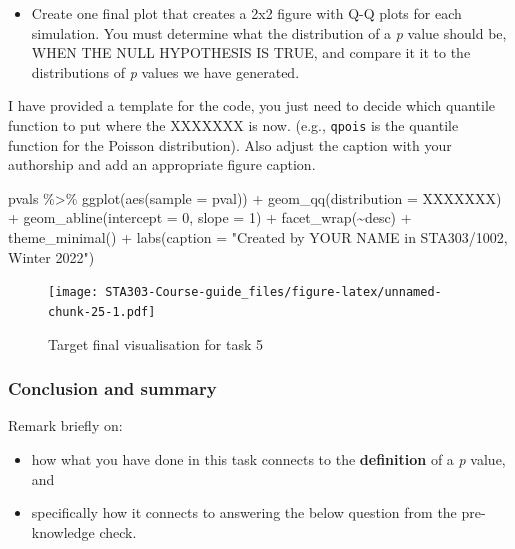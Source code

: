 \documentclass[
  openany]{book}
\newenvironment{Shaded}{\begin{snugshade}}{\end{snugshade}}
\newcommand{\AttributeTok}[1]{\textcolor[rgb]{0.77,0.63,0.00}{#1}}
\newcommand{\DecValTok}[1]{\textcolor[rgb]{0.00,0.00,0.81}{#1}}
\newcommand{\FunctionTok}[1]{\textcolor[rgb]{0.00,0.00,0.00}{#1}}
\newcommand{\NormalTok}[1]{#1}
\newcommand{\SpecialCharTok}[1]{\textcolor[rgb]{0.00,0.00,0.00}{#1}}
\newcommand{\StringTok}[1]{\textcolor[rgb]{0.31,0.60,0.02}{#1}}
\providecommand{\tightlist}{%
  \setlength{\itemsep}{0pt}\setlength{\parskip}{0pt}}
\begin{document}
\begin{itemize}
\tightlist
\item
  Create one final plot that creates a 2x2 figure with Q-Q plots for each simulation. You must determine what the distribution of a \emph{p} value should be, WHEN THE NULL HYPOTHESIS IS TRUE, and compare it it to the distributions of \emph{p} values we have generated.
\end{itemize}

I have provided a template for the code, you just need to decide which quantile function to put where the XXXXXXX is now. (e.g., \texttt{qpois} is the quantile function for the Poisson distribution). Also adjust the caption with your authorship and add an appropriate figure caption.

\begin{Shaded}
\begin{Highlighting}[]
\NormalTok{pvals }\SpecialCharTok{\%\textgreater{}\%} 
  \FunctionTok{ggplot}\NormalTok{(}\FunctionTok{aes}\NormalTok{(}\AttributeTok{sample =}\NormalTok{ pval)) }\SpecialCharTok{+}
  \FunctionTok{geom\_qq}\NormalTok{(}\AttributeTok{distribution =}\NormalTok{ XXXXXXX) }\SpecialCharTok{+}
  \FunctionTok{geom\_abline}\NormalTok{(}\AttributeTok{intercept =} \DecValTok{0}\NormalTok{, }\AttributeTok{slope =} \DecValTok{1}\NormalTok{) }\SpecialCharTok{+}
  \FunctionTok{facet\_wrap}\NormalTok{(}\SpecialCharTok{\textasciitilde{}}\NormalTok{desc) }\SpecialCharTok{+}
  \FunctionTok{theme\_minimal}\NormalTok{() }\SpecialCharTok{+}
  \FunctionTok{labs}\NormalTok{(}\AttributeTok{caption =} \StringTok{"Created by YOUR NAME in STA303/1002, Winter 2022"}\NormalTok{)}
  
\end{Highlighting}
\end{Shaded}

\begin{figure}
\centering
\texttt{[image: STA303-Course-guide\_files/figure-latex/unnamed-chunk-25-1.pdf]}
\caption{\label{fig:unnamed-chunk-25}Target final visualisation for task 5}
\end{figure}

\hypertarget{conclusion-and-summary}{%
\subsubsection{Conclusion and summary}\label{conclusion-and-summary}}

Remark briefly on:

\begin{itemize}
\tightlist
\item
  how what you have done in this task connects to the \textbf{definition} of a \emph{p} value, and\\
\item
  specifically how it connects to answering the below question from the pre-knowledge check.
\end{itemize}
\end{document}
